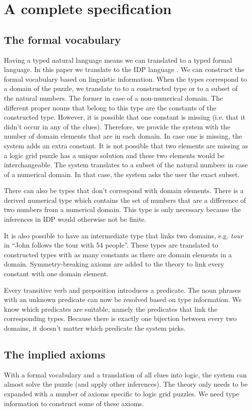 \section{A complete specification}
\subsection{The formal vocabulary}
Having a typed natural language means we can translated to a typed formal language. In this paper we translate to the IDP language \cite{IDP}. We can construct the formal vocabulary based on linguistic information. When the types correspond to a domain of the puzzle, we translate to to a constructed type or to a subset of the natural numbers. The former in case of a non-numerical domain. The different proper nouns that belong to this type are the constants of the constructed type. However, it is possible that one constant is missing (i.e. that it didn't occur in any of the clues). Therefore, we provide the system with the number of domain elements that are in each domain. In case one is missing, the system adds an extra constant. It is not possible that two elements are missing as a logic grid puzzle has a unique solution and these two elements would be interchangeable. The system translates to a subset of the natural numbers in case of a numerical domain. In that case, the system asks the user the exact subset.

There can also be types that don't correspond with domain elements. There is a derived numerical type which contains the set of numbers that are a difference of two numbers from a numerical domain. This type is only necessary because the inferences in IDP would otherwise not be finite.

It is also possible to have an intermediate type that links two domains, e.g. \textit{tour} in ``John follows the tour with 54 people''. These types are translated to constructed types with as many constants as there are domain elements in a domain. Symmetry-breaking axioms are added to the theory to link every constant with one domain element.

Every transitive verb and preposition introduces a predicate. The noun phrases with an unknown predicate can now be resolved based on type information. We know which predicates are suitable, namely the predicates that link the corresponding types. Because there is exactly one bijection between every two domains, it doesn't matter which predicate the system picks.

\subsection{The implied axioms}
With a formal vocabulary and a translation of all clues into logic, the system can almost solve the puzzle (and apply other inferences). The theory only needs to be expanded with a number of axioms specific to logic grid puzzles. We need type information to construct some of these axioms. 

